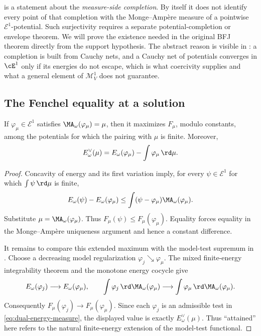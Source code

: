 \begin{remark}
\label{rem:ch28-completion-not-surjectivity}
 is a statement about the
\emph{measure-side completion}.  By itself it does not identify every point
of that completion with the Monge--Amp\`ere measure of a pointwise
\(\mathcal E^1\)-potential.  Such surjectivity requires a separate
potential-completion or envelope theorem.  We will prove the existence
needed in the original BFJ theorem directly from the support hypothesis.
The abstract reason is visible in
: a completion is built from Cauchy nets,
and a Cauchy net of potentials converges in \(\cE^1\) only if its energies
do not escape, which is what coercivity supplies and what a general element
of \(\mathcal M^1_V\) does not guarantee.
\end{remark}

\subsection{The Fenchel equality at a solution}
\label{sec:ch28-fenchel-equality}

\begin{corollary}
\label{cor:finite-energy-variational-characterization}
If \(\varphi_\mu\in\mathcal E^1\) satisfies
\(\MA_\omega(\varphi_\mu)=\mu\), then it maximizes \(F_\mu\), modulo
constants, among the potentials for which the pairing with \(\mu\) is
finite.  Moreover,
\begin{equation}
\label{eq:dual-energy-attained}
 E_\omega^\vee(\mu)
 =E_\omega(\varphi_\mu)-
      \int\varphi_\mu\,\rd \mu.
\end{equation}
\end{corollary}

\begin{proof}
Concavity of energy and its first variation imply, for every
\(\psi\in\mathcal E^1\) for which \(\int\psi\,\rd \mu\) is finite,
\[
 E_\omega(\psi)-E_\omega(\varphi_\mu)
 \leq\int(\psi-\varphi_\mu)\MA_\omega(\varphi_\mu).
\]
Substitute \(\mu=\MA_\omega(\varphi_\mu)\).  Thus
\(F_\mu(\psi)\leq F_\mu(\varphi_\mu)\).  Equality forces equality in the
Monge--Amp\`ere uniqueness argument and hence a constant difference.

It remains to compare this extended maximum with the model-test supremum
in .  Choose a decreasing model
regularization \(\varphi_j\searrow\varphi_\mu\).  The mixed
finite-energy integrability theorem and the monotone energy cocycle give
\[
 E_\omega(\varphi_j)\longrightarrow E_\omega(\varphi_\mu),
 \qquad
 \int\varphi_j\,\rd \MA_\omega(\varphi_\mu)
   \longrightarrow
 \int\varphi_\mu\,\rd \MA_\omega(\varphi_\mu).
\]
Consequently \(F_\mu(\varphi_j)\to F_\mu(\varphi_\mu)\).  Since each
\(\varphi_j\) is an admissible test in
\eqref{eq:dual-energy-measure}, the displayed value is exactly
\(E_\omega^\vee(\mu)\).  Thus ``attained'' here refers to the natural
finite-energy extension of the model-test functional.
\end{proof}

